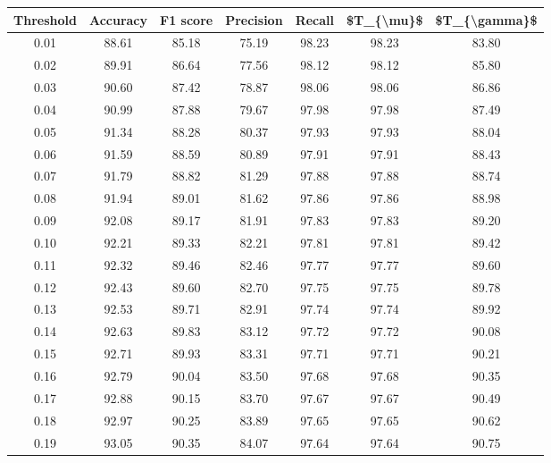 \begin{tabular}{|c|c|c|c|c|c|c|}
\hline
 Threshold &  Accuracy &  F1 score &  Precision &  Recall &  \$T\_\{\textbackslash mu\}\$ &  \$T\_\{\textbackslash gamma\}\$ \\
\hline
      0.01 &     88.61 &     85.18 &      75.19 &   98.23 &      98.23 &         83.80 \\
      0.02 &     89.91 &     86.64 &      77.56 &   98.12 &      98.12 &         85.80 \\
      0.03 &     90.60 &     87.42 &      78.87 &   98.06 &      98.06 &         86.86 \\
      0.04 &     90.99 &     87.88 &      79.67 &   97.98 &      97.98 &         87.49 \\
      0.05 &     91.34 &     88.28 &      80.37 &   97.93 &      97.93 &         88.04 \\
      0.06 &     91.59 &     88.59 &      80.89 &   97.91 &      97.91 &         88.43 \\
      0.07 &     91.79 &     88.82 &      81.29 &   97.88 &      97.88 &         88.74 \\
      0.08 &     91.94 &     89.01 &      81.62 &   97.86 &      97.86 &         88.98 \\
      0.09 &     92.08 &     89.17 &      81.91 &   97.83 &      97.83 &         89.20 \\
      0.10 &     92.21 &     89.33 &      82.21 &   97.81 &      97.81 &         89.42 \\
      0.11 &     92.32 &     89.46 &      82.46 &   97.77 &      97.77 &         89.60 \\
      0.12 &     92.43 &     89.60 &      82.70 &   97.75 &      97.75 &         89.78 \\
      0.13 &     92.53 &     89.71 &      82.91 &   97.74 &      97.74 &         89.92 \\
      0.14 &     92.63 &     89.83 &      83.12 &   97.72 &      97.72 &         90.08 \\
      0.15 &     92.71 &     89.93 &      83.31 &   97.71 &      97.71 &         90.21 \\
      0.16 &     92.79 &     90.04 &      83.50 &   97.68 &      97.68 &         90.35 \\
      0.17 &     92.88 &     90.15 &      83.70 &   97.67 &      97.67 &         90.49 \\
      0.18 &     92.97 &     90.25 &      83.89 &   97.65 &      97.65 &         90.62 \\
      0.19 &     93.05 &     90.35 &      84.07 &   97.64 &      97.64 &         90.75 \\

\end{tabular}
